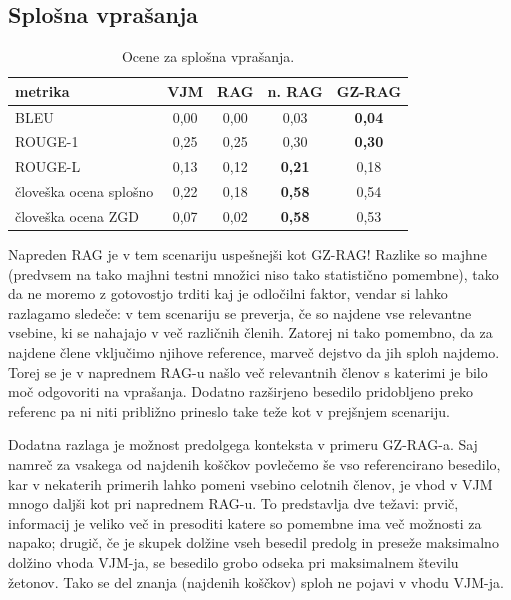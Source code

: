 \documentclass[a4paper,12pt,openright]{book}
\begin{document}
\subsection{Splošna vprašanja}

\begin{table}[H]
\centering
\caption{Ocene za splošna vprašanja.}
\begin{tabular}{|l|c|c|c|c|}
\hline
metrika  & VJM & RAG & n. RAG & GZ-RAG \\ \hline
BLEU           & 0,00     & 0,00     & 0,03     & \textbf{0,04}     \\ \hline
ROUGE-1        & 0,25     & 0,25     & 0,30     & \textbf{0,30}     \\ \hline
ROUGE-L        & 0,13     & 0,12     & \textbf{0,21}     & 0,18     \\ \hline
človeška ocena splošno & 0,22     & 0,18     & \textbf{0,58}     & 0,54     \\ \hline
človeška ocena ZGD & 0,07     & 0,02   & \textbf{0,58} & 0,53    \\ \hline
\end{tabular}
\end{table}

Napreden RAG je v tem scenariju uspešnejši kot GZ-RAG! Razlike so majhne (predvsem na tako majhni testni množici niso tako statistično pomembne), tako da ne moremo z gotovostjo trditi kaj je odločilni faktor, vendar si lahko razlagamo sledeče: v tem scenariju se preverja, če so najdene vse relevantne vsebine, ki se nahajajo v več različnih členih. Zatorej ni tako pomembno, da za najdene člene vključimo njihove reference, marveč dejstvo da jih sploh najdemo. Torej se je v naprednem RAG-u našlo več relevantnih členov s katerimi je bilo moč odgovoriti na vprašanja. Dodatno razširjeno besedilo pridobljeno preko referenc pa ni niti približno prineslo take teže kot v prejšnjem scenariju.

Dodatna razlaga je možnost predolgega konteksta v primeru GZ-RAG-a. Saj namreč za vsakega od najdenih koščkov povlečemo še vso referencirano besedilo, kar v nekaterih primerih lahko pomeni vsebino celotnih členov, je vhod v VJM mnogo daljši kot pri naprednem RAG-u. To predstavlja dve težavi: prvič, informacij je veliko več in presoditi katere so pomembne ima več možnosti za napako; drugič, če je skupek dolžine vseh besedil predolg in preseže maksimalno dolžino vhoda VJM-ja, se besedilo grobo odseka pri maksimalnem številu žetonov. Tako se del znanja (najdenih koščkov) sploh ne pojavi v vhodu VJM-ja.
\end{document}
